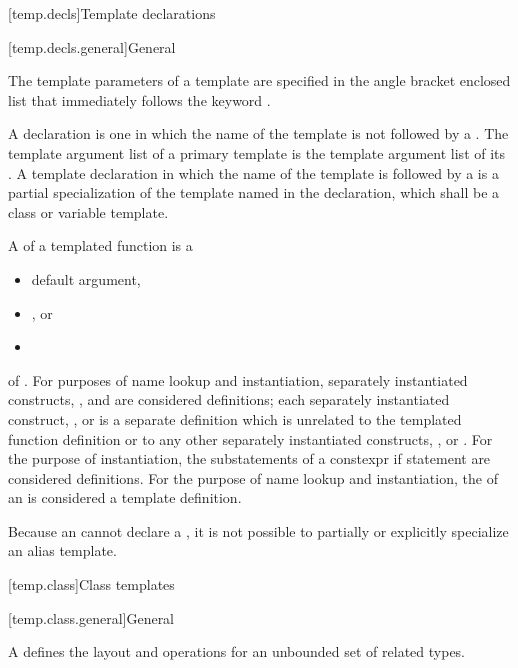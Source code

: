 [temp.decls]{Template declarations}

[temp.decls.general]{General}

\pnum
The template parameters of a template are specified in
the angle bracket enclosed list
that immediately follows the keyword .

\pnum
A  declaration is one
in which the name of the template is not followed by
a .
The template argument list of a primary template is
the template argument list of its .
A template declaration in which the name of the template is followed by
a  is
a partial specialization of
the template named in the declaration,
which shall be a class or variable template.

\pnum
A 
of a templated function  is a
\begin{itemize}
\item default argument,
\item {}, or
\item {}
\end{itemize}
of .
For purposes of name lookup and instantiation,
separately instantiated constructs,
, and
are considered definitions;
each
separately instantiated construct,
, or
is a separate definition
which is unrelated
to the templated function definition or
to any other
separately instantiated constructs,
, or
.
For the purpose of instantiation, the substatements of a constexpr if
statement are considered definitions.
For the purpose of name lookup and instantiation,
the  of an 
is considered a template definition.

\pnum
Because an  cannot declare a
, it is not possible to partially or
explicitly specialize an alias template.

[temp.class]{Class templates}

[temp.class.general]{General}

\pnum
A
defines the layout and operations
for an unbounded set of related types.

